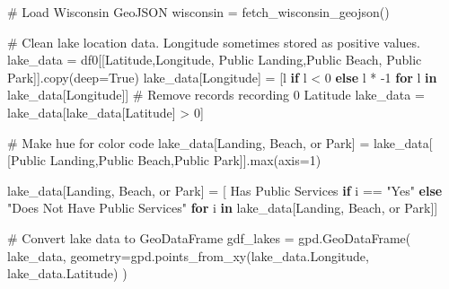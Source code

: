 \documentclass[
]{article}
\newenvironment{Shaded}{\begin{snugshade}}{\end{snugshade}}
\newcommand{\BuiltInTok}[1]{\textcolor[rgb]{0.00,0.23,0.31}{#1}}
\newcommand{\CommentTok}[1]{\textcolor[rgb]{0.37,0.37,0.37}{#1}}
\newcommand{\ControlFlowTok}[1]{\textcolor[rgb]{0.00,0.23,0.31}{\textbf{#1}}}
\newcommand{\DecValTok}[1]{\textcolor[rgb]{0.68,0.00,0.00}{#1}}
\newcommand{\KeywordTok}[1]{\textcolor[rgb]{0.00,0.23,0.31}{\textbf{#1}}}
\newcommand{\NormalTok}[1]{\textcolor[rgb]{0.00,0.23,0.31}{#1}}
\newcommand{\OperatorTok}[1]{\textcolor[rgb]{0.37,0.37,0.37}{#1}}
\newcommand{\StringTok}[1]{\textcolor[rgb]{0.13,0.47,0.30}{#1}}
\newcommand{\VariableTok}[1]{\textcolor[rgb]{0.07,0.07,0.07}{#1}}
\begin{document}
\begin{Shaded}
\begin{Highlighting}[]
\CommentTok{\# Load Wisconsin GeoJSON}
\NormalTok{wisconsin }\OperatorTok{=}\NormalTok{ fetch\_wisconsin\_geojson()}

\CommentTok{\# Clean lake location data. Longitude sometimes stored as positive values.}
\NormalTok{lake\_data }\OperatorTok{=}\NormalTok{ df0[[}\StringTok{\textquotesingle{}Latitude\textquotesingle{}}\NormalTok{,}\StringTok{\textquotesingle{}Longitude\textquotesingle{}}\NormalTok{,}
                \StringTok{\textquotesingle{}Public Landing\textquotesingle{}}\NormalTok{,}\StringTok{\textquotesingle{}Public Beach\textquotesingle{}}\NormalTok{,}
                \StringTok{\textquotesingle{}Public Park\textquotesingle{}}\NormalTok{]].copy(deep}\OperatorTok{=}\VariableTok{True}\NormalTok{)}
\NormalTok{lake\_data[}\StringTok{\textquotesingle{}Longitude\textquotesingle{}}\NormalTok{] }\OperatorTok{=}\NormalTok{ [l }\ControlFlowTok{if}\NormalTok{ l }\OperatorTok{\textless{}} \DecValTok{0} \ControlFlowTok{else}\NormalTok{ l }\OperatorTok{*} \OperatorTok{{-}}\DecValTok{1} \ControlFlowTok{for}\NormalTok{ l }\KeywordTok{in}\NormalTok{ lake\_data[}\StringTok{\textquotesingle{}Longitude\textquotesingle{}}\NormalTok{]]}
\CommentTok{\# Remove records recording 0 Latitude}
\NormalTok{lake\_data }\OperatorTok{=}\NormalTok{ lake\_data[lake\_data[}\StringTok{\textquotesingle{}Latitude\textquotesingle{}}\NormalTok{] }\OperatorTok{\textgreater{}} \DecValTok{0}\NormalTok{]}

\CommentTok{\# Make hue for color code}
\NormalTok{lake\_data[}\StringTok{\textquotesingle{}Landing, Beach, or Park\textquotesingle{}}\NormalTok{] }\OperatorTok{=}\NormalTok{ lake\_data[}
\NormalTok{    [}\StringTok{\textquotesingle{}Public Landing\textquotesingle{}}\NormalTok{,}\StringTok{\textquotesingle{}Public Beach\textquotesingle{}}\NormalTok{,}\StringTok{\textquotesingle{}Public Park\textquotesingle{}}\NormalTok{]].}\BuiltInTok{max}\NormalTok{(axis}\OperatorTok{=}\DecValTok{1}\NormalTok{)}

\NormalTok{lake\_data[}\StringTok{\textquotesingle{}Landing, Beach, or Park\textquotesingle{}}\NormalTok{] }\OperatorTok{=}\NormalTok{ [}
    \StringTok{\textquotesingle{}Has Public Services\textquotesingle{}} \ControlFlowTok{if}\NormalTok{ i }\OperatorTok{==} \StringTok{"Yes"} 
    \ControlFlowTok{else} \StringTok{"Does Not Have Public Services"} \ControlFlowTok{for}\NormalTok{ i }\KeywordTok{in}\NormalTok{ lake\_data[}\StringTok{\textquotesingle{}Landing, Beach, or Park\textquotesingle{}}\NormalTok{]]}

\CommentTok{\# Convert lake data to GeoDataFrame}
\NormalTok{gdf\_lakes }\OperatorTok{=}\NormalTok{ gpd.GeoDataFrame(}
\NormalTok{    lake\_data, geometry}\OperatorTok{=}\NormalTok{gpd.points\_from\_xy(lake\_data.Longitude, lake\_data.Latitude)}
\NormalTok{)}


\end{Highlighting}
\end{Shaded}
\end{document}
